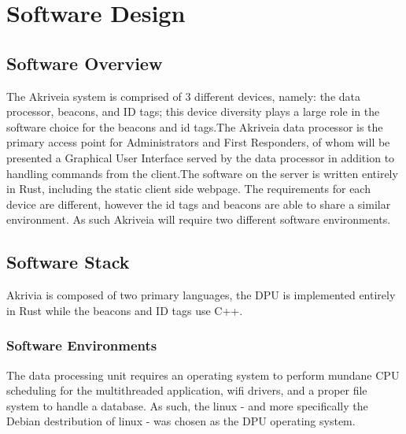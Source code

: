 

\setcounter{section}{5}
\section{Software Design}
\bigskip



\subsection{Software Overview}
The Akriveia system is comprised of 3 different devices, namely: the data processor, beacons, and ID tags; this device diversity plays a large role in the software choice for the beacons and id tags.The Akriveia data processor is the primary access point for Administrators and First Responders, of whom will be presented a Graphical User Interface served by the data processor in addition to handling commands from the client.The software on the server is written entirely in Rust, including the static client side webpage. The requirements for each device are different, however the id tags and beacons are able to share a similar environment.
As such Akriveia will require two different software environments.

\medskip
\subsection{Software Stack}
Akrivia is composed of two primary languages, the DPU is implemented entirely in Rust while the beacons and ID tags use C++.

\medskip
\subsubsection{Software Environments}
The data processing unit requires an operating system to perform mundane CPU scheduling for the multithreaded application, wifi drivers, and a proper file system to handle a database.
As such, the linux - and more specifically the \Gls{Debian} destribution of linux - was chosen as the DPU operating system.

